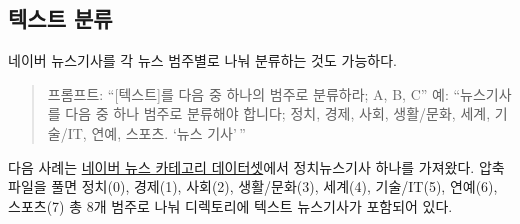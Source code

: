 \documentclass[
  letterpaper,
]{book}
\begin{document}
\hypertarget{uxd14duxc2a4uxd2b8-uxbd84uxb958}{%
\subsection{텍스트 분류}\label{uxd14duxc2a4uxd2b8-uxbd84uxb958}}

네이버 뉴스기사를 각 뉴스 범주별로 나눠 분류하는 것도 가능하다.

\begin{quote}
프롬프트: ``{[}텍스트{]}를 다음 중 하나의 범주로 분류하라; A, B, C'' 예:
``뉴스기사를 다음 중 하나 범주로 분류해야 합니다; 정치, 경제, 사회,
생활/문화, 세계, 기술/IT, 연예, 스포츠. `뉴스 기사'\,''
\end{quote}

다음 사례는
\href{https://drive.google.com/drive/folders/1EHYsVtcgpcacM2Ta33pTLYfp6CznaUX3?usp=sharing}{네이버
뉴스 카테고리 데이터셋}에서 정치뉴스기사 하나를 가져왔다. 압축파일을
풀면 정치(0), 경제(1), 사회(2), 생활/문화(3), 세계(4), 기술/IT(5),
연예(6), 스포츠(7) 총 8개 범주로 나눠 디렉토리에 텍스트 뉴스기사가
포함되어 있다.
\end{document}
